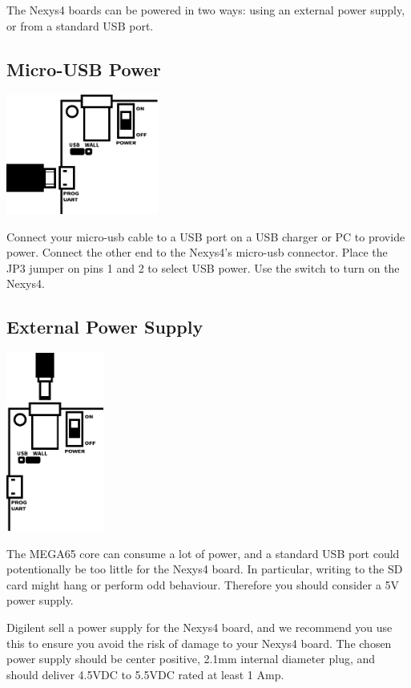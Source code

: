 The Nexys4 boards can be powered in two ways: using an external power supply, or from a standard USB port.

\subsection{Micro-USB Power}

\includegraphics[width=5cm]{images/illustrations/nexys-micro-usb-power.pdf}

Connect your micro-usb cable to a USB port on a USB charger or PC to provide power. Connect the other end to the Nexys4's micro-usb connector. Place the JP3 jumper on pins 1 and 2 to select USB power. Use the switch to turn on the Nexys4.

\subsection{External Power Supply}

\hspace*{1.7cm}
\includegraphics[width=3.2cm]{images/illustrations/nexys-power-supply.pdf}

The MEGA65 core can consume a lot of power, and a standard USB port could potentionally be too little for the Nexys4 board. In particular, writing to the SD card might hang or perform odd behaviour. Therefore you should consider a 5V power supply.

Digilent sell a power supply for the Nexys4 board, and we recommend you use this to ensure you avoid the risk of damage to your Nexys4 board. The chosen power supply should be center positive, 2.1mm internal diameter plug, and should deliver 4.5VDC to 5.5VDC rated at least 1 Amp.


